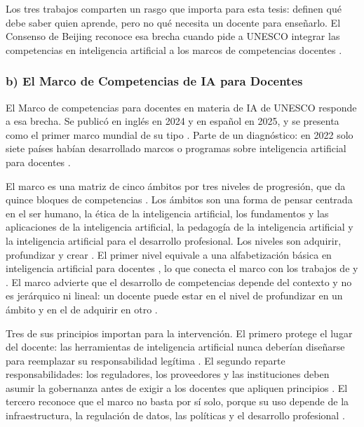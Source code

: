 Los tres trabajos comparten un rasgo que importa para esta tesis: definen qué debe saber
quien aprende, pero no qué necesita un docente para enseñarlo. El Consenso de Beijing
reconoce esa brecha cuando pide a UNESCO integrar las competencias en inteligencia
artificial a los marcos de competencias docentes \citep[párr.~42]{unesco2019beijing}.

\subsubsection*{b) El Marco de Competencias de IA para Docentes}

El Marco de competencias para docentes en materia de IA de UNESCO responde a esa brecha.
Se publicó en inglés en 2024 y en español en 2025, y se presenta como el primer marco
mundial de su tipo \citep[p.~6]{unesco2024aicft}. Parte de un diagnóstico: en 2022 solo
siete países habían desarrollado marcos o programas sobre inteligencia artificial para
docentes \citep[p.~13]{unesco2024aicft}.

El marco es una matriz de cinco ámbitos por tres niveles de progresión, que da quince
bloques de competencias \citep[p.~21]{unesco2024aicft}. Los ámbitos son una forma de
pensar centrada en el ser humano, la ética de la inteligencia artificial, los fundamentos y
las aplicaciones de la inteligencia artificial, la pedagogía de la inteligencia artificial y
la inteligencia artificial para el desarrollo profesional. Los niveles son adquirir,
profundizar y crear \citep[pp.~21--22]{unesco2024aicft}. El primer nivel equivale a una
alfabetización básica en inteligencia artificial para docentes \citep[pp.~24--25]{unesco2024aicft},
lo que conecta el marco con los trabajos de \citet{long2020ailiteracy} y
\citet{ng2021ailiteracy}. El marco advierte que el desarrollo de competencias depende del
contexto y no es jerárquico ni lineal: un docente puede estar en el nivel de profundizar en
un ámbito y en el de adquirir en otro \citep[pp.~21, 25]{unesco2024aicft}.

Tres de sus principios importan para la intervención. El primero protege el lugar del
docente: las herramientas de inteligencia artificial nunca deberían diseñarse para
reemplazar su responsabilidad legítima \citep[p.~18]{unesco2024aicft}. El segundo reparte
responsabilidades: los reguladores, los proveedores y las instituciones deben asumir la
gobernanza antes de exigir a los docentes que apliquen principios
\citep[p.~17]{unesco2024aicft}. El tercero reconoce que el marco no basta por sí solo,
porque su uso depende de la infraestructura, la regulación de datos, las políticas y el
desarrollo profesional \citep[p.~22]{unesco2024aicft}.


